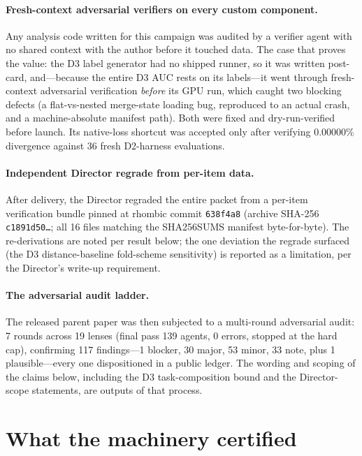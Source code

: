 \documentclass[10pt]{article}
\begin{document}
\paragraph{Fresh-context adversarial verifiers on every custom component.}
Any analysis code written for this campaign was audited by a verifier agent
with no shared context with the author before it touched data. The case
that proves the value: the D3 label generator had no shipped runner, so it
was written post-card, and---because the entire D3 AUC rests on its
labels---it went through fresh-context adversarial verification
\emph{before} its GPU run, which caught two blocking defects (a
flat-vs-nested merge-state loading bug, reproduced to an actual crash, and
a machine-absolute manifest path). Both were fixed and dry-run-verified
before launch. Its native-loss shortcut was accepted only after verifying
0.00000\% divergence against 36 fresh D2-harness evaluations.

\paragraph{Independent Director regrade from per-item data.} After
delivery, the Director regraded the entire packet from a per-item
verification bundle pinned at rhombic commit \texttt{638f4a8} (archive
SHA-256 \texttt{c1891d50\ldots}; all 16 files matching the SHA256SUMS
manifest byte-for-byte). The re-derivations are noted per result below;
the one deviation the regrade surfaced (the D3 distance-baseline
fold-scheme sensitivity) is reported as a limitation, per the Director's
write-up requirement.

\paragraph{The adversarial audit ladder.} The released parent paper was
then subjected to a multi-round adversarial audit: 7 rounds across 19
lenses (final pass 139 agents, 0 errors, stopped at the hard cap),
confirming 117 findings---1 blocker, 30 major, 53 minor, 33 note, plus 1
plausible---every one dispositioned in a public ledger. The wording and
scoping of the claims below, including the D3 task-composition bound and
the Director-scope statements, are outputs of that process.

\section{What the machinery certified}
\label{sec:results}
\end{document}
